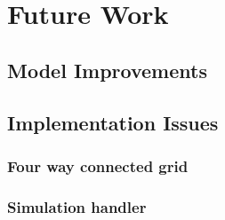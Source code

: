 \chapter{Future Work}
\label{ch:future-work}

\section{Model Improvements}
\section{Implementation Issues}
\subsection{Four way connected grid}
\subsection{Simulation handler}